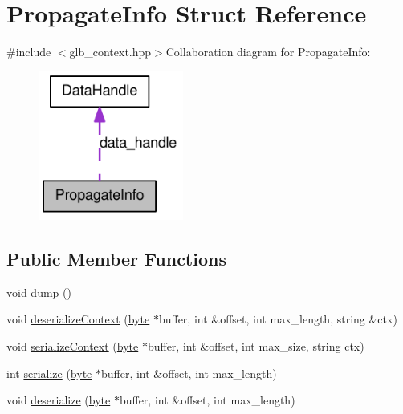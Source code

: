 \hypertarget{struct_propagate_info}{
\section{PropagateInfo Struct Reference}
\label{struct_propagate_info}
}


{\ttfamily \#include $<$glb\_\-context.hpp$>$}Collaboration diagram for PropagateInfo:\nopagebreak
\begin{figure}[H]
\begin{center}
\leavevmode
\includegraphics[width=135pt]{struct_propagate_info__coll__graph}
\end{center}
\end{figure}
\subsection*{Public Member Functions}
\begin{DoxyCompactItemize}
\item 
void \hyperlink{struct_propagate_info_a87392639ebf09cbb6bb70edf7dc4c1aa}{dump} ()
\item 
void \hyperlink{struct_propagate_info_a8ae3a3e60a3ecec9a24e2d8ff3af8c57}{deserializeContext} (\hyperlink{engine_8hpp_a0c8186d9b9b7880309c27230bbb5e69d}{byte} $\ast$buffer, int \&offset, int max\_\-length, string \&ctx)
\item 
void \hyperlink{struct_propagate_info_a22a3541d5c61ed5e6db3aeaf8c4a2f82}{serializeContext} (\hyperlink{engine_8hpp_a0c8186d9b9b7880309c27230bbb5e69d}{byte} $\ast$buffer, int \&offset, int max\_\-size, string ctx)
\item 
int \hyperlink{struct_propagate_info_ac7242171f175704c50333d053aa72c72}{serialize} (\hyperlink{engine_8hpp_a0c8186d9b9b7880309c27230bbb5e69d}{byte} $\ast$buffer, int \&offset, int max\_\-length)
\item 
void \hyperlink{struct_propagate_info_a7dd786107e3f53d7b24d7482709a3347}{deserialize} (\hyperlink{engine_8hpp_a0c8186d9b9b7880309c27230bbb5e69d}{byte} $\ast$buffer, int \&offset, int max\_\-length)
\end{DoxyCompactItemize}
